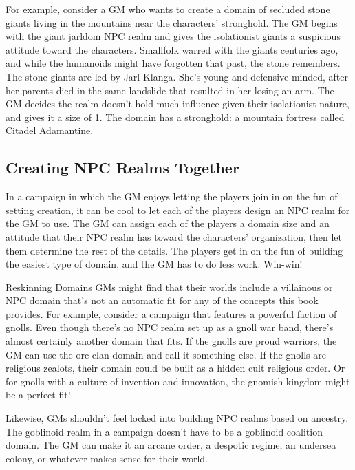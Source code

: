 \documentclass[10pt,a4paper,twoside,bg=print,twocolumn,openany,nodeprecatedcode]{dndbook}
\begin{document}
For example, consider a GM who wants to create a domain of secluded stone giants living in the mountains near the characters' stronghold. The GM begins with the giant jarldom NPC realm and gives the isolationist giants a suspicious attitude toward the characters. Smallfolk warred with the giants centuries ago, and while the humanoids might have forgotten that past, the stone remembers. The stone giants are led by Jarl Klanga. She's young and defensive minded, after her parents died in the same landslide that resulted in her losing an arm. The GM decides the realm doesn't hold much influence given their isolationist nature, and gives it a size of 1. The domain has a stronghold: a mountain fortress called Citadel Adamantine.

\subsection{Creating NPC Realms Together}
In a campaign in which the GM enjoys letting the players join in on the fun of setting creation, it can be cool to let each of the players design an NPC realm for the GM to use. The GM can assign each of the players a domain size and an attitude that their NPC realm has toward the characters' organization, then let them determine the rest of the details. The players get in on the fun of building the easiest type of domain, and the GM has to do less work. Win-win!

\begin{DndSidebar}[float=!b]{Reskinning Domains}
GMs might find that their worlds include a villainous or NPC domain that's not an automatic fit for any of the concepts this book provides. For example, consider a campaign that features a powerful faction of gnolls. Even though there's no NPC realm set up as a gnoll war band, there's almost certainly another domain that fits. If the gnolls are proud warriors, the GM can use the orc clan domain and call it something else. If the gnolls are religious zealots, their domain could be built as a hidden cult religious order. Or for gnolls with a culture of invention and innovation, the gnomish kingdom might be a perfect fit!



Likewise, GMs shouldn't feel locked into building NPC realms based on ancestry. The goblinoid realm in a campaign doesn't have to be a goblinoid coalition domain. The GM can make it an arcane order, a despotic regime, an undersea colony, or whatever makes sense for their world.



\end{DndSidebar}
\end{document}
